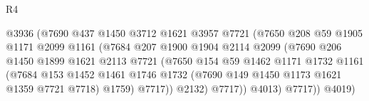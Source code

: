 \begin{lexlean}{R4}
\begin{coremodule}
                                        @3936
                                        (@7690
                                          @437
                                          @1450
                                          @3712
                                          @1621
                                          @3957
                                          @7721
                                          (@7650
                                            @208
                                            @59
                                            @1905
                                            @1171
                                            @2099
                                            @1161
                                            (@7684
                                              @207
                                              @1900
                                              @1904
                                              @2114
                                              @2099
                                              (@7690
                                                @206
                                                @1450
                                                @1899
                                                @1621
                                                @2113
                                                @7721
                                                (@7650
                                                  @154
                                                  @59
                                                  @1462
                                                  @1171
                                                  @1732
                                                  @1161
                                                  (@7684
                                                    @153
                                                    @1452
                                                    @1461
                                                    @1746
                                                    @1732
                                                    (@7690 @149 @1450 @1173 @1621 @1359 @7721 @7718)
                                                    @1759)
                                                  @7717))
                                              @2132)
                                            @7717))
                                        @4013)
                                      @7717))
                                  @4019)

\end{coremodule}
\end{lexlean}
